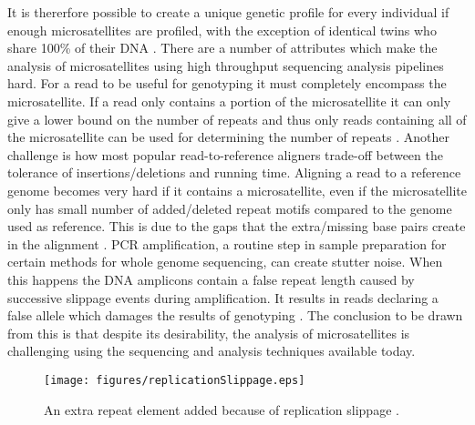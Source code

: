 \documentclass{bioinfo}
\begin{document}
It is thererfore possible to create a unique genetic profile for every individual if enough microsatellites are profiled, with the exception of identical twins who share 100\% of their DNA \cite{NHGRI1999}.
There are a number of attributes which make the analysis of microsatellites using high throughput sequencing analysis pipelines hard. For a read to be useful for genotyping it must completely encompass the microsatellite. If a read only contains a portion of the microsatellite it can only give a lower bound on the number of repeats and thus only reads containing all of the microsatellite can be used for determining the number of repeats \cite{Gymrek2012}. Another challenge is how most popular read-to-reference aligners trade-off between the tolerance of insertions/deletions and running time.
Aligning a read to a reference genome becomes very hard if it contains a microsatellite, even if the microsatellite only has small number of added/deleted repeat motifs compared to the genome used as reference. This is due to the gaps that the extra/missing base pairs create in the alignment \cite{Li2010}. PCR amplification, a routine step in sample preparation for certain methods for whole genome sequencing, can create stutter noise. When this happens the DNA amplicons contain a false repeat length caused by successive slippage events during amplification. It results in reads declaring a false allele which damages the results of genotyping \cite{Ellegren2004}. The conclusion to be drawn from this is that despite its desirability, the analysis of microsatellites is challenging using the sequencing and analysis techniques available today.
\begin{figure}[ht]
\centering
 \texttt{[image: figures/replicationSlippage.eps]}
  \caption[Replication Slippage]{An extra repeat element added because of replication slippage \cite{Brown2002}.}
 \label{fig:RepSlipp}
\end{figure}



\end{document}

